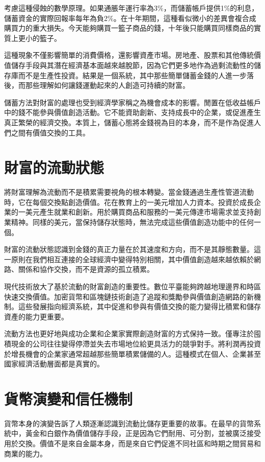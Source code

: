 \documentclass[
  Letterpaper,
]{scrbook}
\begin{document}
考慮這種侵蝕的數學原理。如果通脹年運行率為3\%，而儲蓄帳戶提供1\%的利息，儲蓄資金的實際回報率每年為負2\%。在十年期間，這種看似微小的差異會複合成購買力的重大損失。今天能夠購買一籃子商品的錢，十年後只能購買同樣商品的實質上更小的籃子。

這種現象不僅影響簡單的消費價格，還影響資產市場。房地產、股票和其他傳統價值儲存手段與其潛在經濟基本面越來越脫節，因為它們更多地作為過剩流動性的儲存庫而不是生產性投資。結果是一個系統，其中那些簡單儲蓄金錢的人進一步落後，而那些理解如何讓錢運動起來的人創造可持續的財富。

儲蓄方法對財富的處理也受到經濟學家稱之為機會成本的影響。閒置在低收益帳戶中的錢不能參與價值創造活動。它不能資助創新、支持成長中的企業，或促進產生真正繁榮的經濟交換。本質上，儲蓄心態將金錢視為目的本身，而不是作為促進人們之間有價值交換的工具。

\section{財富的流動狀態}\label{ux8ca1ux5bccux7684ux6d41ux52d5ux72c0ux614b}

將財富理解為流動而不是積累需要視角的根本轉變。當金錢通過生產性管道流動時，它在每個交換點創造價值。花在教育上的一美元增加人力資本。投資於成長企業的一美元產生就業和創新。用於購買商品和服務的一美元傳達市場需求並支持創業精神。同樣的美元，當保持儲存狀態時，無法完成這些價值創造功能中的任何一個。

財富的流動狀態認識到金錢的真正力量在於其速度和方向，而不是其靜態數量。這一原則在我們相互連接的全球經濟中變得特別相關，其中價值創造越來越依賴於網路、關係和協作交換，而不是資源的孤立積累。

現代技術放大了基於流動的財富創造的重要性。數位平臺能夠跨越地理邊界和時區快速交換價值。加密貨幣和區塊鏈技術創造了追蹤和獎勵參與價值創造網路的新機制。這些發展指向經濟系統，其中促進和參與有價值交換的能力變得比積累和儲存資產的能力更重要。

流動方法也更好地與成功企業和企業家實際創造財富的方式保持一致。僅專注於囤積現金的公司往往變得停滯並失去市場地位給更具活力的競爭對手。將利潤再投資於增長機會的企業家通常超越那些簡單積累儲備的人。這種模式在個人、企業甚至國家經濟活動層面都是真實的。

\section{貨幣演變和信任機制}\label{ux8ca8ux5e63ux6f14ux8b8aux548cux4fe1ux4efbux6a5fux5236}

貨幣本身的演變告訴了人類逐漸認識到流動比儲存更重要的故事。在最早的貨幣系統中，黃金和白銀作為價值儲存手段，正是因為它們耐用、可分割，並被廣泛接受用於交換。價值不是來自金屬本身，而是來自它們促進不同社區和時期之間貿易和商業的能力。
\end{document}
